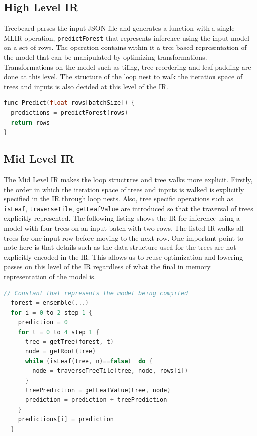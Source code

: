 
\subsection{High Level IR}
Treebeard parses the input JSON file and generates a function with a single MLIR operation, \texttt{predictForest} that represents inference using the input model on a set of rows. The operation contains within it a tree based representation of the model that can be manipulated by optimizing transformations. Transformations on the model such as tiling, tree reordering and leaf padding are done at this level. The structure of the loop nest to walk the iteration space of trees and inputs is also decided at this level of the IR. 

\begin{lstlisting}[language=C++]
func Predict(float rows[batchSize]) {
  predictions = predictForest(rows) 
  return rows
}
\end{lstlisting}

\subsection{Mid Level IR}
The Mid Level IR makes the loop structures and tree walks more explicit. Firstly, the order in which the iteration space of trees and inputs is walked is explicitly specified in the IR through loop nests. Also, tree specific operations such as \texttt{isLeaf}, \texttt{traverseTile}, \texttt{getLeafValue} are introduced so that the traversal of trees explicitly represented. The following listing shows the IR for inference using a model with four trees on an input batch with two rows. The listed IR walks all trees for one input row before moving to the next row. One important point to note here is that details such as the data structure used for the trees are not explicitly encoded in the IR. This allows us to reuse optimization and lowering passes on this level of the IR regardless of what the final in memory representation of the model is.

\begin{lstlisting}[language=C++]
  // Constant that represents the model being compiled
  forest = ensemble(...)
  for i = 0 to 2 step 1 {
    prediction = 0
    for t = 0 to 4 step 1 {
      tree = getTree(forest, t) 
      node = getRoot(tree)
      while (isLeaf(tree, n)==false)  do {
        node = traverseTreeTile(tree, node, rows[i])
      }
      treePrediction = getLeafValue(tree, node)
      prediction = prediction + treePrediction
    }
    predictions[i] = prediction
  }
\end{lstlisting}

